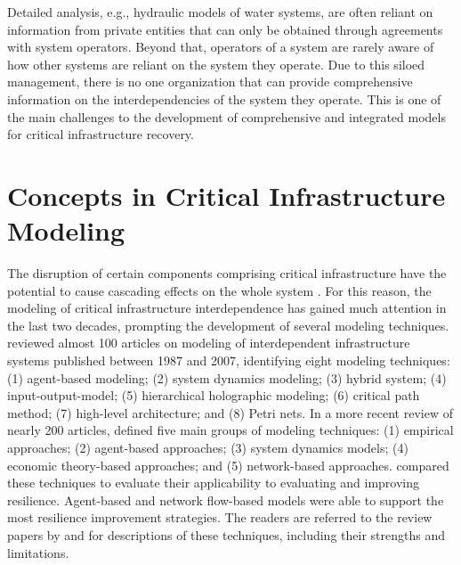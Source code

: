 Detailed analysis, e.g., hydraulic models of water systems, are often reliant on information from private entities that can only be obtained through agreements with system operators. Beyond that, operators of a system are rarely aware of how other systems are reliant on the system they operate. Due to this siloed management, there is no one organization that can provide comprehensive information on the interdependencies of the system they operate. This is one of the main challenges to the development of comprehensive and integrated models for critical infrastructure recovery.\ 

\section{Concepts in Critical Infrastructure Modeling}
The disruption of certain components comprising critical infrastructure have the potential to cause cascading effects on the whole system \citep{rinaldi2001identifying}. For this reason, the modeling of critical infrastructure interdependence has gained much attention in the last two decades, prompting the development of  several modeling techniques. \citet{Eusgeld2008a} reviewed almost 100 articles on modeling of interdependent infrastructure systems published between 1987 and 2007, identifying eight modeling techniques: (1) agent-based modeling; (2) system dynamics modeling; (3) hybrid system; (4) input-output-model; (5) hierarchical holographic modeling; (6) critical path method; (7) high-level architecture; and (8) Petri nets. In a more recent review of nearly 200 articles, \citet{ouyang2014review} defined five main groups of modeling techniques: (1) empirical approaches; (2) agent-based approaches; (3) system dynamics models; (4) economic theory-based approaches; and (5) network-based approaches. \citet{ouyang2014review} compared these techniques to evaluate their applicability to evaluating and improving resilience. Agent-based and network flow-based models were able to support the most resilience improvement strategies. The readers are referred to the review papers by \citet{Eusgeld2008a} and \citet{ouyang2014review} for descriptions of these techniques, including their strengths and limitations. \ 

